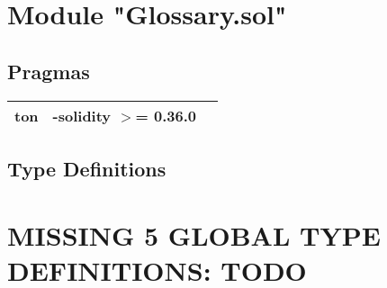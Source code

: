 
\section{Module "Glossary.sol"}


\subsection{Pragmas}


\noindent\begin{tabular}{|l|l|p{5cm}|}\hline
ton & -solidity $>$= 0.36.0 &\\\hline
\end{tabular}


\subsection{Type Definitions}

\section{MISSING 5 GLOBAL TYPE DEFINITIONS: TODO}
